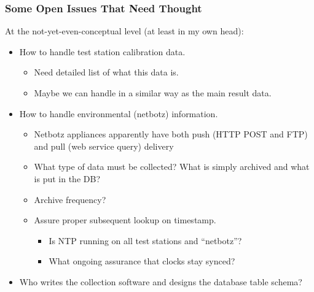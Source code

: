 \documentclass[xcolor=dvipsnames]{beamer}
\begin{document}
\begin{frame}
  \frametitle{Some Open Issues That Need Thought}

  At the not-yet-even-conceptual level (at least in my own head):

  \begin{itemize}
  \item How to handle test station calibration data.
    \begin{itemize}
    \item Need detailed list of what this data is.
    \item Maybe we can handle in a similar way as the main result
      data.
    \end{itemize}
  \item How to handle environmental (netbotz) information.
    \begin{itemize}
    \item Netbotz appliances apparently have both push (HTTP POST and
      FTP) and pull (web service query) delivery
    \item What type of data must be collected?  What is simply
      archived and what is put in the DB?
    \item Archive frequency?
    \item Assure proper subsequent lookup on timestamp.
      \begin{itemize}
      \item Is NTP running on all test stations and ``netbotz''?
      \item What ongoing assurance that clocks stay synced?
      \end{itemize}
    \end{itemize}
  \item Who writes the collection software and designs the database
    table schema?  
  \end{itemize}
\end{frame}
\end{document}
